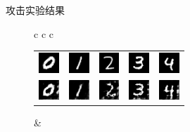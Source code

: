 \documentclass[aspectratio=169]{beamer}
\begin{document}
\begin{frame}{攻击}{实验结果}
\begin{figure}[!ht]
\begin{tabular*}{\textwidth}{c c c}
{\begin{tabular}{lllll}
\includegraphics[width = 0.3in]{fig/original_for_sample_4_950_0.png}  & \includegraphics[width = 0.3in]{fig/original_for_sample_4_960_1.png} & \includegraphics[width = 0.3in]{fig/original_for_sample_5_910_3.png} & \includegraphics[width = 0.3in]{fig/original_for_sample_5_870_4.png} & \includegraphics[width = 0.3in]{fig/original_for_sample_5_830_5.png} \\ 
\includegraphics[width = 0.3in]{fig/sample_4_epoch_950_taskid_0.png}  & \includegraphics[width = 0.3in]{fig/sample_4_epoch_960_taskid_1.png} & \includegraphics[width = 0.3in]{fig/sample_5_epoch_910_taskid_3.png} & \includegraphics[width = 0.3in]{fig/sample_5_epoch_870_taskid_4.png} & \includegraphics[width = 0.3in]{fig/sample_5_epoch_830_taskid_5.png} \\ 
\end{tabular}
}
    &
 \setlength{\tabcolsep}{1pt}
\end{tabular*}
\end{figure}
\end{frame}
\end{document}
